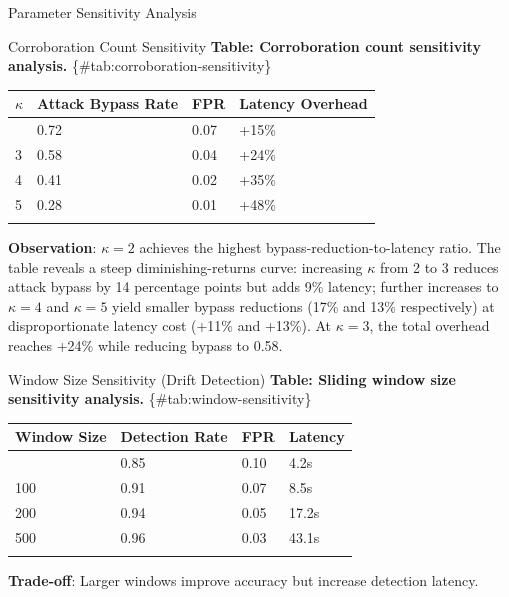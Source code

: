\documentclass[
  ignorenonframetext,
]{beamer}
\newcounter{none} %
\begin{document}
\begin{frame}[fragile]{Parameter Sensitivity Analysis}
\begin{block}{Corroboration Count Sensitivity}
\protect{}\label{sec:corroboration-sensitivity}
\textbf{Table: Corroboration count sensitivity analysis.}
\{\#tab:corroboration-sensitivity\}

{\def\LTcaptype{none} %
\begin{longtable}[]{@{}llll@{}}
\toprule\noalign{}
\(\kappa\) & Attack Bypass Rate & FPR & Latency Overhead \\
\midrule\noalign{}
\endhead
2 & 0.72 & 0.07 & +15\% \\
3 & 0.58 & 0.04 & +24\% \\
4 & 0.41 & 0.02 & +35\% \\
5 & 0.28 & 0.01 & +48\% \\
\bottomrule\noalign{}
\end{longtable}
}

\textbf{Observation}: \(\kappa = 2\) achieves the highest
bypass-reduction-to-latency ratio. The table reveals a steep
diminishing-returns curve: increasing \(\kappa\) from 2 to 3 reduces
attack bypass by 14 percentage points but adds 9\% latency; further
increases to \(\kappa = 4\) and \(\kappa = 5\) yield smaller bypass
reductions (17\% and 13\% respectively) at disproportionate latency cost
(+11\% and +13\%). At \(\kappa = 3\), the total overhead reaches +24\%
while reducing bypass to 0.58.
\end{block}

\begin{block}{Window Size Sensitivity (Drift Detection)}
\protect{}\label{sec:window-sensitivity}
\textbf{Table: Sliding window size sensitivity analysis.}
\{\#tab:window-sensitivity\}

{\def\LTcaptype{none} %
\begin{longtable}[]{@{}llll@{}}
\toprule\noalign{}
Window Size & Detection Rate & FPR & Latency \\
\midrule\noalign{}
\endhead
50 & 0.85 & 0.10 & 4.2s \\
100 & 0.91 & 0.07 & 8.5s \\
200 & 0.94 & 0.05 & 17.2s \\
500 & 0.96 & 0.03 & 43.1s \\
\bottomrule\noalign{}
\end{longtable}
}

\textbf{Trade-off}: Larger windows improve accuracy but increase
detection latency.
\end{block}


\end{frame}
\end{document}
